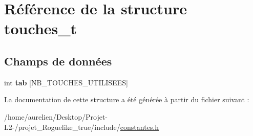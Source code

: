 \hypertarget{structtouches__t}{}\section{Référence de la structure touches\+\_\+t}
\label{structtouches__t}
\subsection*{Champs de données}
\begin{DoxyCompactItemize}
\item 
\mbox{\label{structtouches__t_a7f306b2dfc357765b0bdaba659e45132}} 
int {\bfseries tab} \mbox{[}N\+B\+\_\+\+T\+O\+U\+C\+H\+E\+S\+\_\+\+U\+T\+I\+L\+I\+S\+E\+ES\mbox{]}
\end{DoxyCompactItemize}


La documentation de cette structure a été générée à partir du fichier suivant \+:\begin{DoxyCompactItemize}
\item 
/home/aurelien/\+Desktop/\+Projet-\/\+L2-\//projet\+\_\+\+Roguelike\+\_\+true/include/\hyperlink{constantes_8h}{constantes.\+h}\end{DoxyCompactItemize}
